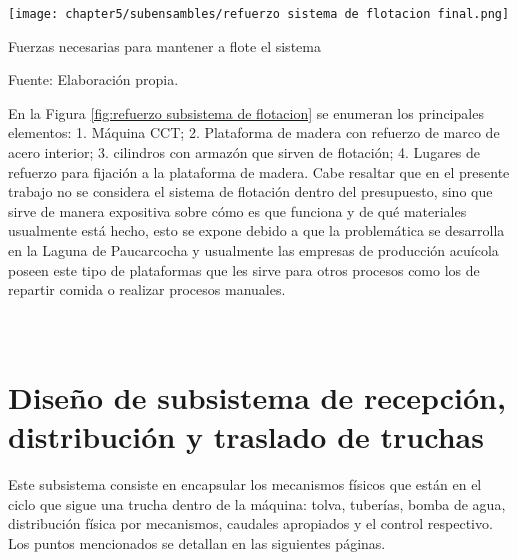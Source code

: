\begin{myfigure}[H]
	\footnotesize\centering
	\texttt{[image: chapter5/subensambles/refuerzo sistema de flotacion final.png]}
	\caption{Fuerzas necesarias para mantener a flote el sistema}
	\begin{myflushcenter}
		Fuente: Elaboración propia.
	\end{myflushcenter}
	\label{fig:refuerzo subsistema de flotacion}
\end{myfigure}

En la Figura \ref{fig:refuerzo subsistema de flotacion} se enumeran los principales elementos: 1. Máquina CCT; 2. Plataforma de madera con refuerzo de marco de acero interior; 3. cilindros con armazón que sirven de flotación; 4. Lugares de refuerzo para fijación a la plataforma de madera. Cabe resaltar que en el presente trabajo no se considera el sistema de flotación dentro del presupuesto, sino que sirve de manera expositiva sobre cómo es que funciona y de qué materiales usualmente está hecho, esto se expone debido a que la problemática se desarrolla en la Laguna de Paucarcocha y usualmente las empresas de producción acuícola poseen este tipo de plataformas que les sirve para otros procesos como los de repartir comida o realizar procesos manuales.






\pagestyle{myportland}
\doublespacing
\chapter[\quad\quad\quad\quad ----- Diseño de subsistema de recepción, distribución y traslado de truchas]{\\ Diseño de subsistema de recepción, distribución y traslado de truchas}
\thispagestyle{myportland}

\label{ssec:diseno de subsistema de recepcion, distribucion y traslado de truchas}

Este subsistema consiste en encapsular los mecanismos físicos que están en el ciclo que sigue una trucha dentro de la máquina: tolva, tuberías, bomba de agua, distribución física por mecanismos, caudales apropiados y el control respectivo. Los puntos mencionados se detallan en las siguientes páginas. %

